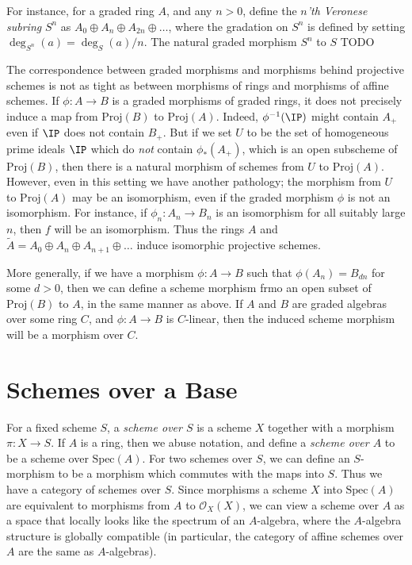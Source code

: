For instance, for a graded ring $A$, and any $n > 0$, define the \emph{$n$'th Veronese subring} $S^n$ as $A_0 \oplus A_n \oplus A_{2n} \oplus \dots$, where the gradation on $S^n$ is defined by setting $\deg_{S^n}(a) = \deg_S(a)/n$. The natural graded morphism $S^n$ to $S$ TODO

The correspondence between graded morphisms and morphisms behind projective schemes is not as tight as between morphisms of rings and morphisms of affine schemes. If $\phi: A \to B$ is a graded morphisms of graded rings, it does not precisely induce a map from $\text{Proj}(B)$ to $\text{Proj}(A)$. Indeed, $\phi^{-1}(\IP)$ might contain $A_+$ even if $\IP$ does not contain $B_+$. But if we set $U$ to be the set of homogeneous prime ideals $\IP$ which do \emph{not} contain $\phi_*(A_+)$, which is an open subscheme of $\text{Proj}(B)$, then there is a natural morphism of schemes from $U$ to $\text{Proj}(A)$. However, even in this setting we have another pathology; the morphism from $U$ to $\text{Proj}(A)$ may be an isomorphism, even if the graded morphism $\phi$ is not an isomorphism. For instance, if $\phi_n: A_n \to B_n$ is an isomorphism for all suitably large $n$, then $f$ will be an isomorphism. Thus the rings $A$ and $\tilde{A} = A_0 \oplus A_n \oplus A_{n+1} \oplus \dots$ induce isomorphic projective schemes.

\begin{remark}
    More generally, if we have a morphism $\phi: A \to B$ such that $\phi(A_n) = B_{dn}$ for some $d > 0$, then we can define a scheme morphism frmo an open subset of $\text{Proj}(B)$ to $A$, in the same manner as above. If $A$ and $B$ are graded algebras over some ring $C$, and $\phi: A \to B$ is $C$-linear, then the induced scheme morphism will be a morphism over $C$.
\end{remark}




















\section{Schemes over a Base}

For a fixed scheme $S$, a \emph{scheme over $S$} is a scheme $X$ together with a morphism $\pi: X \to S$. If $A$ is a ring, then we abuse notation, and define a \emph{scheme over $A$} to be a scheme over $\text{Spec}(A)$. For two schemes over $S$, we can define an $S$-morphism to be a morphism which commutes with the maps into $S$. Thus we have a category of schemes over $S$. Since morphisms a scheme $X$ into $\text{Spec}(A)$ are equivalent to morphisms from $A$ to $\mathcal{O}_X(X)$, we can view a scheme over $A$ as a space that locally looks like the spectrum of an $A$-algebra, where the $A$-algebra structure is globally compatible (in particular, the category of affine schemes over $A$ are the same as $A$-algebras).

